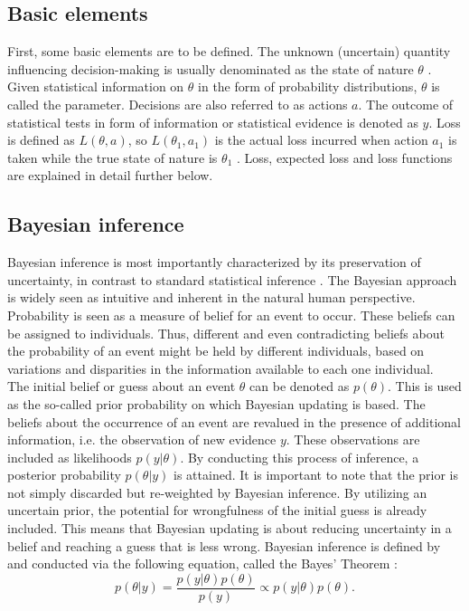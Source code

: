 	    \subsection{Basic elements}
	    First, some basic elements are to be defined. The unknown (uncertain) quantity influencing decision-making is usually denominated as the state of nature $\theta$ \citep{berger2013stat}. Given statistical information on $\theta$ in the form of probability distributions, $\theta$ is called the parameter. 
	    Decisions are also referred to as actions $a$.
	    The outcome of statistical tests in form of information or statistical evidence is denoted as $y$.	    
	    Loss is defined as $L(\theta,a)$, so $L(\theta_1,a_1)$ is the actual loss incurred when action $a_1$ is taken while the true state of nature is $\theta_1$ \citep{berger2013stat}. Loss, expected loss and loss functions are explained in detail further below.  
        
        \subsection{Bayesian inference}
        Bayesian inference is most importantly characterized by its preservation of uncertainty, in contrast to standard statistical inference \citep{box2011bayesian, jaynes2003probability, harney2013bayesian, davidson2015}. The Bayesian approach is widely seen as intuitive and inherent in the natural human perspective. Probability is seen as a measure of belief for an event to occur. These beliefs can be assigned to individuals. Thus, different and even contradicting beliefs about the probability of an event might be held by different individuals, based on variations and disparities in the information available to each one individual.\\
        The initial belief or guess about an event $\theta$ can be denoted as $p(\theta)$. This is used as the so-called prior probability on which Bayesian updating is based. The beliefs about the occurrence of an event are revalued in the presence of additional information, i.e. the observation of new evidence $y$. These observations are included as likelihoods $p(y|\theta)$. By conducting this process of inference, a posterior probability $p(\theta|y)$ is attained. It is important to note that the prior is not simply discarded but re-weighted by Bayesian inference. By utilizing an uncertain prior, the potential for wrongfulness of the initial guess is already included. This means that Bayesian updating is about reducing uncertainty in a belief and reaching a guess that is less wrong. Bayesian inference is defined by and conducted via the following equation, called the Bayes' Theorem \citep{box2011bayesian, jaynes2003probability, harney2013bayesian, davidson2015}:
        \begin{equation}\label{eq:BayesTheorem}
        p(\theta|y) = \frac{p(y|\theta)p(\theta)}{p(y)}
        \propto p(y|\theta)p(\theta).
        \end{equation}
                
